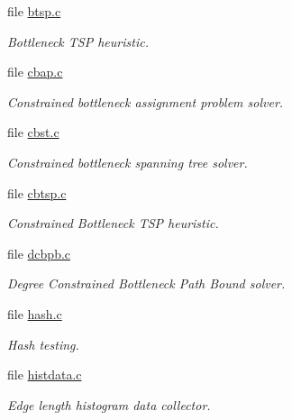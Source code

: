 \begin{CompactItemize}
\item 
file \hyperlink{bin_2btsp_8c}{btsp.c}
\begin{CompactList}\small\item\em Bottleneck TSP heuristic. \item\end{CompactList}

\item 
file \hyperlink{bin_2cbap_8c}{cbap.c}
\begin{CompactList}\small\item\em Constrained bottleneck assignment problem solver. \item\end{CompactList}

\item 
file \hyperlink{bin_2cbst_8c}{cbst.c}
\begin{CompactList}\small\item\em Constrained bottleneck spanning tree solver. \item\end{CompactList}

\item 
file \hyperlink{cbtsp_8c}{cbtsp.c}
\begin{CompactList}\small\item\em Constrained Bottleneck TSP heuristic. \item\end{CompactList}

\item 
file \hyperlink{bin_2dcbpb_8c}{dcbpb.c}
\begin{CompactList}\small\item\em Degree Constrained Bottleneck Path Bound solver. \item\end{CompactList}

\item 
file \hyperlink{bin_2hash_8c}{hash.c}
\begin{CompactList}\small\item\em Hash testing. \item\end{CompactList}

\item 
file \hyperlink{histdata_8c}{histdata.c}
\begin{CompactList}\small\item\em Edge length histogram data collector. \item\end{CompactList}


\end{CompactItemize}
